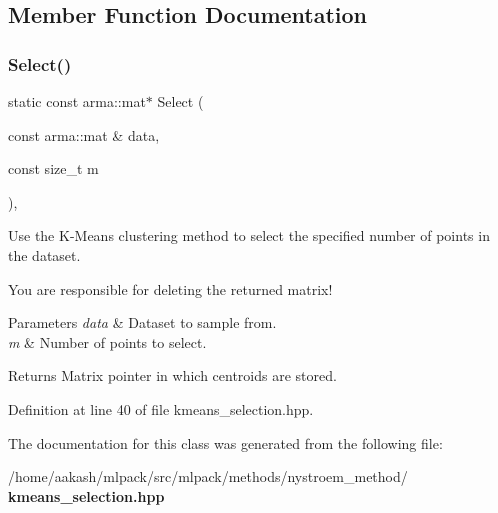 \subsection{Member Function Documentation}
\mbox{\label{classmlpack_1_1kernel_1_1KMeansSelection_a0449697ae86a5d2ed893572da8695c7f}} 
\subsubsection{Select()}
{\footnotesize\ttfamily static const arma\+::mat$\ast$ Select (\begin{DoxyParamCaption}\item[{const arma\+::mat \&}]{data,  }\item[{const size\+\_\+t}]{m }\end{DoxyParamCaption})\hspace{0.3cm}{\ttfamily [inline]}, {\ttfamily [static]}}



Use the K-\/\+Means clustering method to select the specified number of points in the dataset. 

You are responsible for deleting the returned matrix!


\begin{DoxyParams}{Parameters}
{\em data} & Dataset to sample from. \\
\hline
{\em m} & Number of points to select. \\
\hline
\end{DoxyParams}
\begin{DoxyReturn}{Returns}
Matrix pointer in which centroids are stored. 
\end{DoxyReturn}


Definition at line 40 of file kmeans\+\_\+selection.\+hpp.



The documentation for this class was generated from the following file\+:\begin{DoxyCompactItemize}
\item 
/home/aakash/mlpack/src/mlpack/methods/nystroem\+\_\+method/\textbf{ kmeans\+\_\+selection.\+hpp}\end{DoxyCompactItemize}
